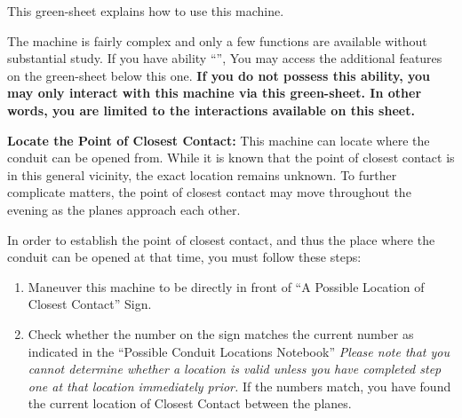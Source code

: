 \documentclass[green]{elementals}
\begin{document}
\name{\gConduitCover{}}


This green-sheet explains how to use this machine.

The machine is fairly complex and only a few functions are available without substantial study. If you have ability ``\aWorkConduit{}'', You may access the additional features on the green-sheet below this one. {\bf If you do not possess this ability, you may only interact with this machine via this green-sheet. In other words, you are limited to the interactions available on this sheet.}

{\bf Locate the Point of Closest Contact:}
This machine can locate where the conduit can be opened from. While it is known that the point of closest contact is in this general vicinity, the exact location remains unknown. To further complicate matters, the point of closest contact may move throughout the evening as the planes approach each other.

In order to establish the point of closest contact, and thus the place where the conduit can be opened at that time, you must follow these steps:
\begin{enumerate}
  \item Maneuver this machine to be directly in front of ``A Possible Location of Closest Contact'' Sign.
  \item Check whether the number on the sign matches the current number as indicated in the ``Possible Conduit Locations Notebook'' \emph{Please note that you cannot determine whether a location is valid unless you have completed step one at that location immediately prior.} If the numbers match, you have found the current location of Closest Contact between the planes.
\end{enumerate}
\end{document}
